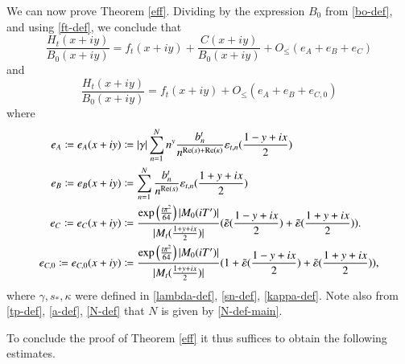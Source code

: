We can now prove Theorem \ref{eff}.  Dividing by the expression $B_0$ from \eqref{bo-def}, and using \eqref{ft-def}, we conclude that
\begin{equation}\label{ratio-form-refined}
\frac{H_t(x+iy)}{B_0(x+iy)} = f_t(x+iy) + \frac{C(x+iy)}{B_0(x+iy)} + O_{\leq}\left( e_A + e_B + e_{C} \right)
\end{equation}
and
\begin{equation}\label{ratio-form}
\frac{H_t(x+iy)}{B_0(x+iy)} = f_t(x+iy) + O_{\leq}\left( e_A + e_B + e_{C,0} \right)
\end{equation}
where
\begin{align}
e_A \coloneqq e_A(x+iy) &\coloneqq |\gamma| \sum_{n=1}^N n^y \frac{b_n^t}{n^{\mathrm{Re}(s) + \mathrm{Re}(\kappa)}} \varepsilon_{t,n}(\frac{1-y+ix}{2}) \label{ea-def}\\
e_B \coloneqq e_B(x+iy) &\coloneqq \sum_{n=1}^N  \frac{b_n^t}{n^{\mathrm{Re}(s)}} \varepsilon_{t,n}(\frac{1+y+ix}{2}) \label{eb-def} \\
e_{C} \coloneqq e_{C}(x+iy) &\coloneqq \frac{\exp\left( \frac{t \pi^2}{64}\right) |M_0(iT')|}{|M_t(\frac{1+y+ix}{2})|} (\tilde {\varepsilon}(\frac{1-y+ix}{2}) + \tilde {\varepsilon}(\frac{1+y+ix}{2})).\label{ecc-def}\\
e_{C,0} \coloneqq e_{C,0}(x+iy) &\coloneqq \frac{\exp\left( \frac{t \pi^2}{64}\right) |M_0(iT')|}{|M_t(\frac{1+y+ix}{2})|} (1 + \tilde {\varepsilon}(\frac{1-y+ix}{2}) + \tilde {\varepsilon}(\frac{1+y+ix}{2})),\label{ec-def}
\end{align}
where $\gamma,s_*,\kappa$ were defined in \eqref{lambda-def}, \eqref{sn-def}, \eqref{kappa-def}.  Note also from \eqref{tp-def}, \eqref{a-def}, \eqref{N-def} that $N$ is given by \eqref{N-def-main}.

To conclude the proof of Theorem \ref{eff} it thus suffices to obtain the following estimates.

